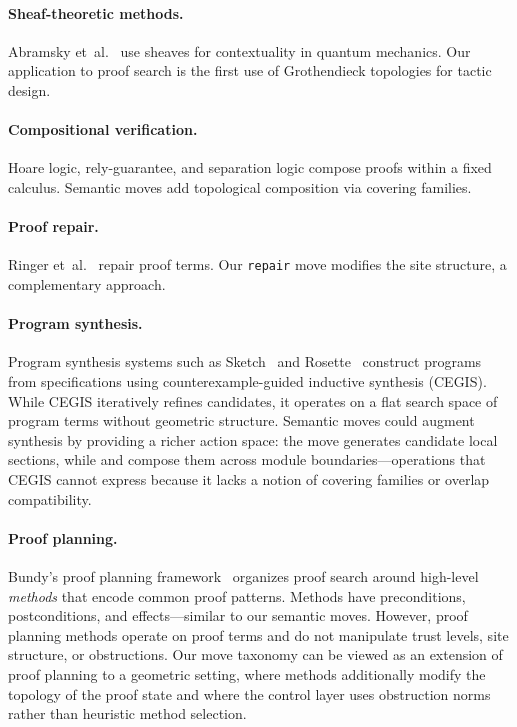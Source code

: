 \documentclass[11pt]{article}
\begin{document}
\paragraph{Sheaf-theoretic methods.}
Abramsky et~al.~\cite{Abramsky2011Sheaves} use sheaves for
contextuality in quantum mechanics.  Our application to proof search
is the first use of Grothendieck topologies for tactic design.

\paragraph{Compositional verification.}
Hoare logic, rely-guarantee, and separation logic compose proofs
within a fixed calculus.  Semantic moves add topological composition
via covering families.

\paragraph{Proof repair.}
Ringer et~al.~\cite{Ringer2021ProofRepair} repair proof terms.
Our \texttt{repair} move modifies the site structure, a complementary
approach.

\paragraph{Program synthesis.}
Program synthesis systems such as Sketch~\cite{Solar-Lezama2008Sketch}
and Rosette~\cite{Torlak2014Rosette} construct programs from
specifications using counterexample-guided inductive synthesis (CEGIS).
While CEGIS iteratively refines candidates, it operates on a flat
search space of program terms without geometric structure.
Semantic moves could augment synthesis by providing a richer
action space: the \CONSTRUCT{} move generates candidate
local sections, while \GLUE{} and \ESCALATE{} compose them
across module boundaries---operations that CEGIS cannot express
because it lacks a notion of covering families or overlap
compatibility.

\paragraph{Proof planning.}
Bundy's proof planning framework~\cite{Bundy1988ProofPlanning}
organizes proof search around high-level \emph{methods} that
encode common proof patterns.  Methods have preconditions,
postconditions, and effects---similar to our semantic moves.
However, proof planning methods operate on proof terms and
do not manipulate trust levels, site structure, or
obstructions.  Our move taxonomy can be viewed as an
extension of proof planning to a geometric setting, where
methods additionally modify the topology of the proof state
and where the control layer uses obstruction norms rather
than heuristic method selection.
\end{document}
